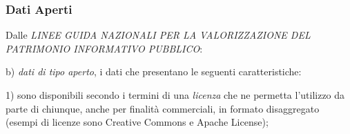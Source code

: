 \documentclass[8pt]{beamer}
\begin{document}
\begin{frame}
\frametitle{Dati Aperti}

Dalle \emph{LINEE GUIDA NAZIONALI PER LA VALORIZZAZIONE DEL PATRIMONIO
INFORMATIVO PUBBLICO}:
\vspace{\baselineskip}

b) \emph{dati di tipo aperto}, i dati che presentano le seguenti caratteristiche:
\vspace{\baselineskip}

1) sono disponibili secondo i termini di una \emph{licenza} che ne permetta
l'utilizzo da parte di chiunque, anche per finalit\`a commerciali, in formato
disaggregato (esempi di licenze sono Creative Commons e Apache License);
\vspace{\baselineskip}

\vspace{\baselineskip}

\vspace{\baselineskip}

\vspace{\baselineskip}


\end{frame}
\end{document}
